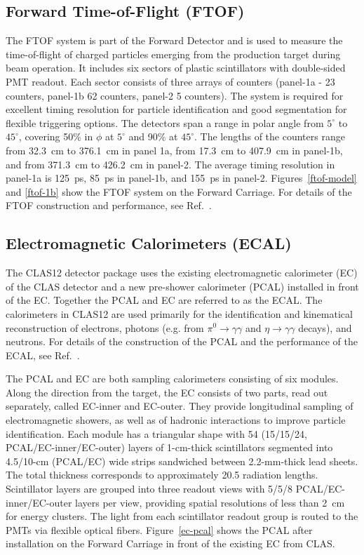\documentclass[final,3p]{elsarticle}
\begin{document}
\begin{twocolumn}
\subsection{Forward Time-of-Flight (FTOF)}
\label{ftof}

The FTOF system is part of the Forward Detector and is used to measure the time-of-flight of charged particles 
emerging from the production target during beam operation. It includes six sectors of plastic scintillators with 
double-sided PMT readout. Each sector consists of three arrays of counters (panel-1a - 23 counters, panel-1b 62
counters, panel-2 5 counters). The system is required for excellent timing resolution for particle identification and
good segmentation for flexible triggering options. The detectors span a range in polar angle from $5^\circ$ to
$45^\circ$, covering 50\% in $\phi$ at $5^\circ$ and 90\% at $45^\circ$. The lengths of the counters range from
32.3~cm to 376.1~cm in panel 1a, from 17.3~cm to 407.9~cm in panel-1b, and from 371.3~cm to 426.2~cm in panel-2.
The average timing resolution in panel-1a is 125~ps, 85~ps in panel-1b, and 155~ps in panel-2.
Figures~\ref{ftof-model} and \ref{ftof-1b} show the FTOF system on the Forward Carriage. For details of the
FTOF construction and performance, see Ref.~\cite{FTOF}. 

\subsection{Electromagnetic Calorimeters (ECAL)}

The CLAS12 detector package uses the existing electromagnetic calorimeter (EC) of the CLAS detector
\cite{Amarian:2001zs} and a new pre-shower calorimeter (PCAL) installed in front of the EC. Together the
PCAL and EC are referred to as the ECAL. The calorimeters in CLAS12 are used primarily for the identification
and kinematical reconstruction of electrons, photons (e.g. from $\pi^0 \to \gamma \gamma$ and
$\eta \to \gamma  \gamma$ decays), and neutrons. For details of the construction of the PCAL and the
performance of the ECAL, see Ref.~\cite{ECAL}. 

The PCAL and EC are both sampling calorimeters consisting of six modules. Along the direction from the target,
the EC consists of two parts, read out separately, called EC-inner and EC-outer. They provide longitudinal sampling
of electromagnetic showers, as well as of hadronic interactions to improve particle identification. Each module has a
triangular shape with 54 (15/15/24, PCAL/EC-inner/EC-outer) layers of 1-cm-thick scintillators segmented into
4.5/10-cm (PCAL/EC) wide strips sandwiched between 2.2-mm-thick lead sheets. The total thickness corresponds to
approximately 20.5 radiation lengths. Scintillator layers are grouped into three readout views with 5/5/8
PCAL/EC-inner/EC-outer layers per view, providing spatial resolutions of less than 2~cm for energy clusters. The
light from each scintillator readout group is routed to the PMTs via flexible optical fibers. Figure~\ref{ec-pcal}
shows the PCAL after installation on the Forward Carriage in front of the existing EC from CLAS.


\end{twocolumn}
\end{document}
